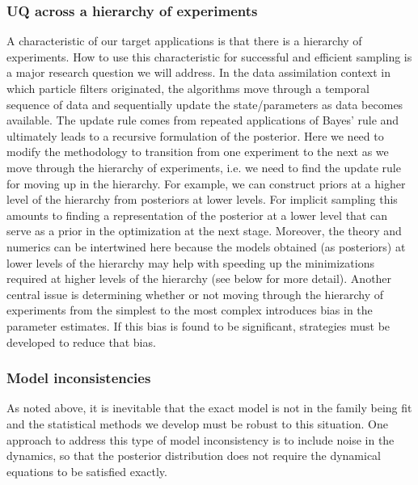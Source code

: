 \documentclass[11pt]{article}
\newcommand{\MarginPar}[1]{\marginpar{%
\vskip-\baselineskip %
\raggedright\tiny\sffamily
\hrule\smallskip{\color{red}#1}\par\smallskip\hrule}}
\begin{document}
\subsubsection*{UQ across a hierarchy of experiments}
A characteristic of our target applications is that there is a hierarchy of experiments.
How to use this characteristic for successful and efficient sampling is a major research question we will address.
In the data assimilation context in which particle filters originated, the algorithms move through a temporal sequence of data and sequentially update the state/parameters as data becomes available.
The update rule comes from repeated applications of Bayes' rule and ultimately leads to a recursive formulation of the posterior.
Here we need to modify the methodology to transition from one experiment to the next as we move through the hierarchy of experiments, i.e. we need to find the update rule for moving up in the hierarchy.
For example, we can construct priors at a higher level of the hierarchy from posteriors at lower levels. For implicit sampling this amounts to finding a representation of the posterior at a lower level that can serve as a prior in the optimization at the next stage.
Moreover, the theory and numerics can be intertwined here because the models obtained (as posteriors) at lower levels of the hierarchy may help with speeding up the minimizations required at higher levels of the hierarchy (see below for more detail). 
Another central issue is determining whether or not moving through the hierarchy of experiments from the simplest to the most complex introduces bias in the parameter estimates. If this bias is found to be significant, strategies must be developed to reduce that bias. 

\subsubsection*{Model inconsistencies}

As noted above, it is inevitable that the exact model is not in the family being fit and
the statistical methods we develop must be robust to this situation.
One approach to address this type of model inconsistency 
is to include noise in the dynamics, so that the posterior distribution does not require the
dynamical equations to be satisfied exactly.
\end{document}
